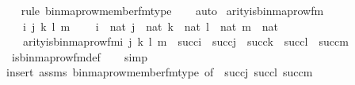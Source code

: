 \begin{isabellebody}
\ \ \isamarkupfalse%
{\isacharparenleft}{\kern0pt}rule\ binmap{\isacharunderscore}{\kern0pt}row{\isacharprime}{\kern0pt}{\isacharunderscore}{\kern0pt}member{\isacharunderscore}{\kern0pt}fm{\isacharunderscore}{\kern0pt}type{\isacharparenright}{\kern0pt}\isanewline
\ \ \isamarkupfalse%
\ auto%
\endisatagproof
{\isafoldproof}%
%
\isadelimproof
\isanewline
%
\endisadelimproof
\isanewline
{}\isamarkupfalse%
\ arity{\isacharunderscore}{\kern0pt}is{\isacharunderscore}{\kern0pt}binmap{\isacharunderscore}{\kern0pt}row{\isacharprime}{\kern0pt}{\isacharunderscore}{\kern0pt}fm\ {\isacharcolon}{\kern0pt}\ \isanewline
\ \ \ i\ j\ k\ l\ m\ \isanewline
\ \ \ {\isachardoublequoteopen}i\ {\isasymin}\ nat{\isachardoublequoteclose}\ {\isachardoublequoteopen}j\ {\isasymin}\ nat{\isachardoublequoteclose}\ {\isachardoublequoteopen}k\ {\isasymin}\ nat{\isachardoublequoteclose}\ {\isachardoublequoteopen}l\ {\isasymin}\ nat{\isachardoublequoteclose}\ {\isachardoublequoteopen}m\ {\isasymin}\ nat{\isachardoublequoteclose}\ \isanewline
\ \ \ {\isachardoublequoteopen}arity{\isacharparenleft}{\kern0pt}is{\isacharunderscore}{\kern0pt}binmap{\isacharunderscore}{\kern0pt}row{\isacharprime}{\kern0pt}{\isacharunderscore}{\kern0pt}fm{\isacharparenleft}{\kern0pt}i{\isacharcomma}{\kern0pt}\ j{\isacharcomma}{\kern0pt}\ k{\isacharcomma}{\kern0pt}\ l{\isacharcomma}{\kern0pt}\ m{\isacharparenright}{\kern0pt}{\isacharparenright}{\kern0pt}\ {\isasymle}\ succ{\isacharparenleft}{\kern0pt}i{\isacharparenright}{\kern0pt}\ {\isasymunion}\ succ{\isacharparenleft}{\kern0pt}j{\isacharparenright}{\kern0pt}\ {\isasymunion}\ succ{\isacharparenleft}{\kern0pt}k{\isacharparenright}{\kern0pt}\ {\isasymunion}\ succ{\isacharparenleft}{\kern0pt}l{\isacharparenright}{\kern0pt}\ {\isasymunion}\ succ{\isacharparenleft}{\kern0pt}m{\isacharparenright}{\kern0pt}{\isachardoublequoteclose}\ \isanewline
%
\isadelimproof
\ \ %
\endisadelimproof
%
\isatagproof
{}\isamarkupfalse%
\ is{\isacharunderscore}{\kern0pt}binmap{\isacharunderscore}{\kern0pt}row{\isacharprime}{\kern0pt}{\isacharunderscore}{\kern0pt}fm{\isacharunderscore}{\kern0pt}def\isanewline
\ \ \isamarkupfalse%
\ simp\isanewline
\ \ \isamarkupfalse%
{\isacharparenleft}{\kern0pt}insert\ assms\ binmap{\isacharunderscore}{\kern0pt}row{\isacharprime}{\kern0pt}{\isacharunderscore}{\kern0pt}member{\isacharunderscore}{\kern0pt}fm{\isacharunderscore}{\kern0pt}type\ {\isacharbrackleft}{\kern0pt}of\ {}\ {\isachardoublequoteopen}succ{\isacharparenleft}{\kern0pt}j{\isacharparenright}{\kern0pt}{\isachardoublequoteclose}\ {\isachardoublequoteopen}succ{\isacharparenleft}{\kern0pt}l{\isacharparenright}{\kern0pt}{\isachardoublequoteclose}\ {\isachardoublequoteopen}succ{\isacharparenleft}{\kern0pt}m{\isacharparenright}{\kern0pt}{\isachardoublequoteclose}{\isacharbrackright}{\kern0pt}{\isacharparenright}{\kern0pt}\isanewline

\end{isabellebody}
